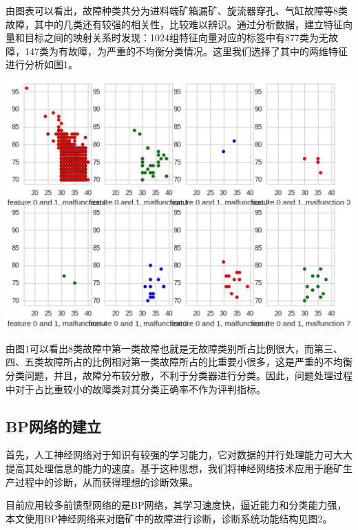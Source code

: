 \documentclass{ctacn}%
\begin{document}
\begin{multicols}{2}

由图表可以看出，故障种类共分为进料端矿箱漏矿、旋流器穿孔、气缸故障等8类故障，其中的几类还有较强的相关性，比较难以辨识。通过分析数据，建立特征向量和目标之间的映射关系时发现：1024组特征向量对应的标签中有877类为无故障，147类为有故障，为严重的不均衡分类情况。这里我们选择了其中的两维特征进行分析如图1。
\begin{center}
	\includegraphics[scale=0.4, trim=0 0 0 0]{figs/data_features}\\
	\label{fig1}
\end{center}

由图1可以看出8类故障中第一类故障也就是无故障类别所占比例很大，而第三、四、五类故障所占的比例相对第一类故障所占的比重要小很多，这是严重的不均衡分类问题，并且，故障分布较分散，不利于分类器进行分类。因此，问题处理过程中对于占比重较小的故障类对其分类正确率不作为评判指标。

\subsection{BP网络的建立}

首先，人工神经网络对于知识有较强的学习能力，它对数据的并行处理能力可大大提高其处理信息的能力的速度。基于这种思想，我们将神经网络技术应用于磨矿生产过程中的诊断，从而获得理想的诊断效果。

目前应用较多前馈型网络的是BP网络，其学习速度快，逼近能力和分类能力强，本文使用BP神经网络来对磨矿中的故障进行诊断，诊断系统功能结构见图2。


\end{multicols}
\end{document}
